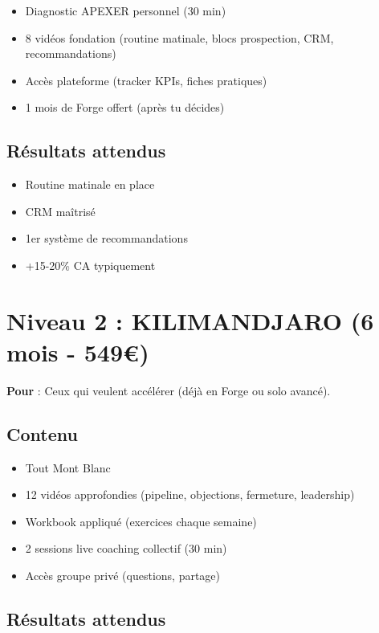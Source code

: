 \documentclass[12pt,a4paper,openany]{book}
\begin{document}
\begin{itemize}
\item Diagnostic APEXER personnel (30 min)
\item 8 vidéos fondation (routine matinale, blocs prospection, CRM, recommandations)
\item Accès plateforme (tracker KPIs, fiches pratiques)
\item 1 mois de Forge offert (après tu décides)
\end{itemize}

\subsection{Résultats attendus}

\begin{itemize}
\item Routine matinale en place
\item CRM maîtrisé
\item 1er système de recommandations
\item +15-20\% CA typiquement
\end{itemize}

\section{Niveau 2 : KILIMANDJARO (6 mois - 549\euro{})}

\textbf{Pour} : Ceux qui veulent accélérer (déjà en Forge ou solo avancé).

\subsection{Contenu}

\begin{itemize}
\item Tout Mont Blanc
\item 12 vidéos approfondies (pipeline, objections, fermeture, leadership)
\item Workbook appliqué (exercices chaque semaine)
\item 2 sessions live coaching collectif (30 min)
\item Accès groupe privé (questions, partage)
\end{itemize}

\subsection{Résultats attendus}
\end{document}
